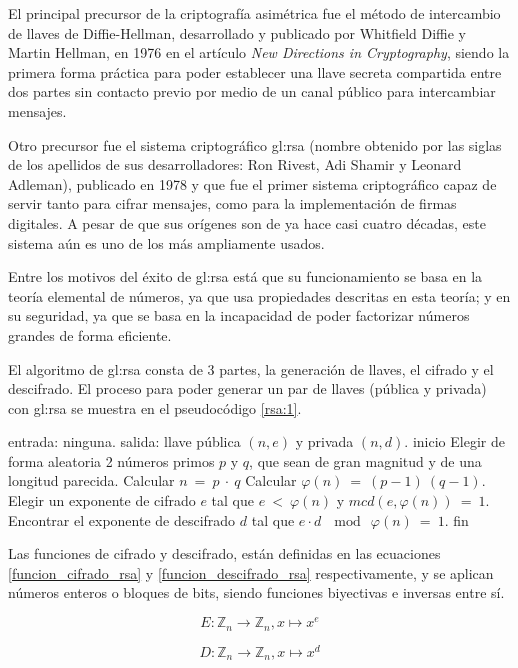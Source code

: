   El principal precursor de la criptografía asimétrica fue el método de 
  intercambio de llaves de Diffie-Hellman, desarrollado y publicado por 
  Whitfield Diffie y Martin Hellman, en 1976 en el artículo \textit{New 
  Directions in Cryptography}, siendo la primera forma práctica para poder 
  establecer una llave secreta compartida entre dos partes sin contacto 
  previo por medio de un canal público para intercambiar mensajes.

  Otro precursor fue el sistema criptográfico \acrshort{gl:rsa} (nombre 
  obtenido por las siglas de los apellidos de sus desarrolladores: Ron Rivest, 
  Adi Shamir y Leonard Adleman), publicado en 1978 y que fue el primer sistema 
  criptográfico capaz de servir tanto para cifrar mensajes, como para la 
  implementación de firmas digitales. A pesar de que sus orígenes son de ya 
  hace casi cuatro décadas, este sistema aún es uno de los más ampliamente 
  usados.

  Entre los motivos del éxito de \acrshort{gl:rsa} está que su funcionamiento 
  se basa en la teoría elemental de números, ya que usa propiedades descritas 
  en esta teoría; y en su seguridad, ya que se basa en la incapacidad de poder 
  factorizar números grandes de forma eficiente.

  El algoritmo de \acrshort{gl:rsa} consta de 3 partes, la generación de llaves, 
  el cifrado y el descifrado. El proceso para poder generar un par de llaves 
  (pública y privada) con \acrshort{gl:rsa} se muestra en el pseudocódigo 
  \ref{rsa:1}. 

  \begin{pseudocodigo}[caption={Proceso de generación de llaves de 
    \acrshort{gl:rsa}.}, label={rsa:1}]
    entrada: ninguna.
    salida:  llave pública $(n,e)$ y privada $(n,d)$.
    inicio
      Elegir de forma aleatoria 2 números primos $p$ y $q$, que sean de gran 
      magnitud y de una longitud parecida.
      Calcular $n\: =\: p \:\cdot \:q$
      Calcular $\varphi(n) \:= \:(p-1) \:(q-1)$.
      Elegir un exponente de cifrado $e$ tal que $e \:< \:\varphi(n)$ y $mcd(e,\varphi(n)) \:= \:1$.
      Encontrar el exponente de descifrado $d$ tal que $e \cdot d \:\mod \:\varphi(n) \:= \:1$.
    fin
  \end{pseudocodigo}

  Las funciones de cifrado y descifrado, están definidas en las ecuaciones 
  \ref{funcion_cifrado_rsa} y \ref{funcion_descifrado_rsa} respectivamente, 
  y se aplican números enteros o bloques de bits, siendo funciones biyectivas 
  e inversas entre sí.

  \begin{equation}
    \label{funcion_cifrado_rsa}
    E: \mathbb{Z}_n \longrightarrow \mathbb{Z}_n, x \longmapsto x^e 
  \end{equation}

  \begin{equation}
    \label{funcion_descifrado_rsa}
    D: \mathbb{Z}_n \longrightarrow \mathbb{Z}_n, x \longmapsto x^d 
  \end{equation}

